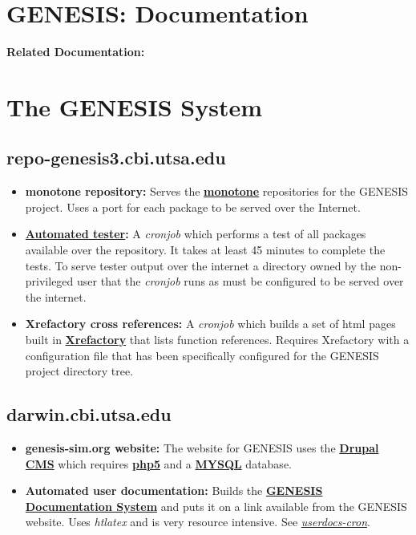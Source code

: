 \documentclass[12pt]{article}
\begin{document}
\section*{GENESIS: Documentation}

{\bf Related Documentation:}

\section*{The GENESIS System}

\subsection*{\bf repo-genesis3.cbi.utsa.edu}

\begin{itemize}

\item {\bf monotone repository:} Serves the \href{http://www.monotone.ca/}{\bf monotone} repositories for the GENESIS project. Uses a port for each package to be served over the Internet.

\item {\bf \href{../neurospaces-tester/neurospaces-tester.tex}{Automated tester}:} A {\it cronjob} which performs a test of all packages available over the repository.  It takes at least 45 minutes to complete the tests. To serve tester output over the internet a directory owned by the non-privileged user that the {\it cronjob} runs as must be configured to be served over the internet.

\item {\bf Xrefactory cross references:} A {\it cronjob} which builds a set of html pages built in \href{http://www.xref-tech.com/xrefactory/main.html}{\bf Xrefactory} that lists function references.  Requires Xrefactory with a configuration file that has been specifically configured for the GENESIS project directory tree. 

\end{itemize}

\subsection*{\bf darwin.cbi.utsa.edu}

\begin{itemize}

\item {\bf genesis-sim.org website:} The website for GENESIS uses the \href{http://drupal.org/}{\bf Drupal CMS} which requires \href{http://www.php.net/}{\bf php5} and a \href{http://www.mysql.com/}{\bf MYSQL} database.

\item {\bf Automated user documentation:} Builds the \href{../documentation-overview/documentation-overview.tex}{\bf GENESIS Documentation System} and puts it on a link available from the GENESIS website.  Uses {\it htlatex} and is very resource intensive.  See \href{../userdocs-cron/userdocs-cron.tex}{\it userdocs-cron}.

\end{itemize}
\end{document}
